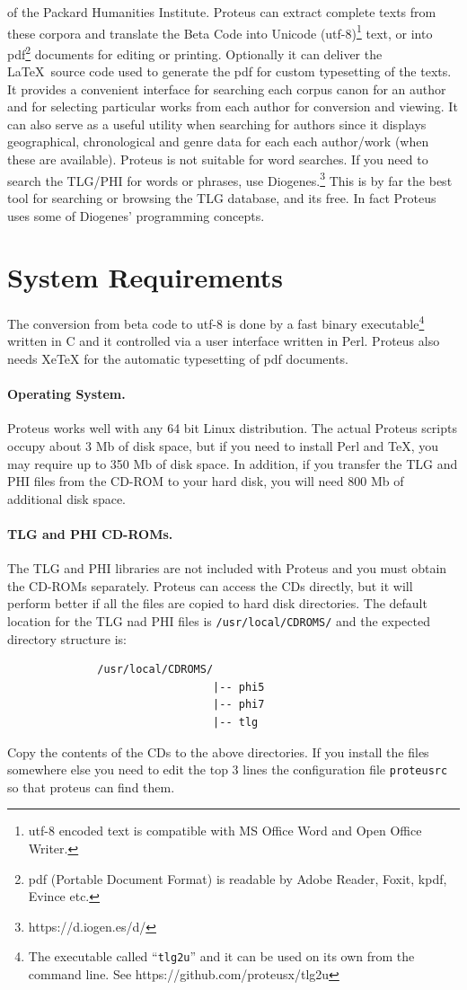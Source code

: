 \documentclass[11pt,a4paper]{article}
\begin{document}
  of the Packard Humanities Institute.
  Proteus can extract complete texts from these corpora
  and translate the Beta Code into Unicode (utf-8)\footnote{utf-8 encoded
  text is compatible with MS Office Word and Open Office Writer.}
  text, or into pdf\footnote{ pdf (Portable Document Format)
  is readable by Adobe Reader, Foxit, kpdf, Evince etc.}
  documents for editing or printing. Optionally it can deliver the \LaTeX\
  source code used to generate the pdf for custom typesetting of the texts.
  It provides a convenient
  interface for searching each corpus canon for an author and for selecting
  particular works from each author for conversion and viewing.
  It can also serve as a useful utility when searching for
  authors since it displays geographical, chronological and genre
  data for each each author/work (when these are available).
  Proteus is not suitable for word searches.  If you need to search the
  TLG/PHI for words or phrases, use
  Diogenes.\footnote{https://d.iogen.es/d/}
  This is by far the best tool for searching or browsing the TLG database,
  and its free. In fact Proteus uses some of Diogenes' programming concepts.
\section{System Requirements}
  The conversion from beta code to utf-8 is done by a fast binary
  executable\footnote{The executable called ``{\tt tlg2u}'' and it
  can be used on its own from the command line. See https://github.com/proteusx/tlg2u}
  written in C
  and it controlled via a user interface written in Perl.
  Proteus also needs XeTeX for the automatic typesetting of pdf documents.
  \paragraph{Operating System.}
  Proteus works well with any 64 bit Linux distribution.
  The actual Proteus scripts occupy about 3 Mb of disk space, but if you
  need to install Perl and \TeX{}, you may require up to 350 Mb of disk space.
  In addition, if you transfer the TLG and PHI files from the CD-ROM to
  your hard disk, you will need 800 Mb of additional disk space.
  \paragraph{TLG and PHI CD-ROMs.}
  The TLG and PHI libraries are not included with
  Proteus and you must obtain the CD-ROMs separately. Proteus can
  access the CDs directly, but it will perform better if all the files are
  copied to hard disk directories. The default location for the TLG nad PHI files is
  {\tt /usr/local/CDROMS/} and the expected directory structure is:
  \begin{verbatim}
              /usr/local/CDROMS/
                                |-- phi5
                                |-- phi7
                                |-- tlg
  \end{verbatim}
  Copy the contents of the CDs to the above directories.  If you install the
  files somewhere else you need to edit the top 3 lines the configuration
  file {\tt proteusrc} so that proteus can find them.
\end{document}
